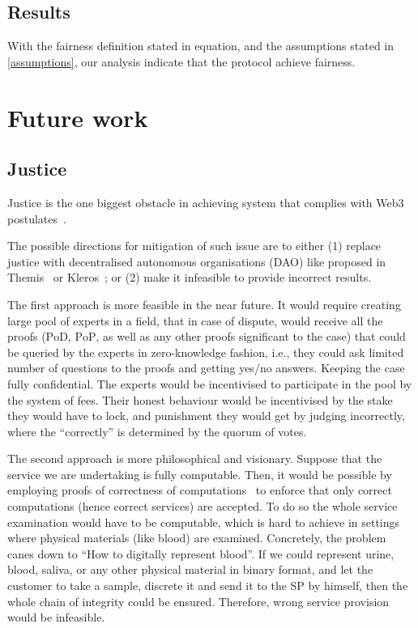 \documentclass{ieeeaccess}
\begin{document}
\subsection{Results}\label{results}

With the fairness definition stated in equation, and the assumptions stated in \ref{assumptions}, our analysis indicate that the protocol achieve fairness.



\section{Future work}\label{sec:future-work}
\subsection{Justice}\label{justice}

Justice is the one biggest obstacle in achieving system that complies with Web3 postulates~\cite{Web3Wiki71}.

The possible directions for mitigation of such issue are to either (1) replace justice with decentralised autonomous organisations (DAO) like proposed in Themis~\cite{meng2019themis} or Kleros~\cite{lesaege2018kleros}; or (2) make it infeasible to provide incorrect results.

The first approach is more feasible in the near future. It would require creating large pool of experts in a field, that in case of dispute, would receive all the proofs ($\mathrm{PoD}$, $\mathrm{PoP}$, as well as any other proofs significant to the case) that could be queried by the experts in zero-knowledge fashion, i.e., they could ask limited number of questions to the proofs and getting yes/no answers. Keeping the case fully confidential. The experts would be incentivised to participate in the pool by the system of fees. Their honest behaviour would be incentivised by the stake they would have to lock, and punishment they would get by judging incorrectly, where the ``correctly'' is determined by the quorum of votes.

The second approach is more philosophical and visionary. Suppose that the service we are undertaking is fully computable. Then, it would be possible by employing proofs of correctness of computations~\cite{ben2013snarks} to enforce that only correct computations (hence correct services) are accepted. To do so the whole service examination would have to be computable, which is hard to achieve in settings where physical materials (like blood) are examined. Concretely, the problem canes down to ``How to digitally represent blood''. If we could represent urine, blood, saliva, or any other physical material in binary format, and let the customer to take a sample, discrete it and send it to the SP by himself, then the whole chain of integrity could be ensured. Therefore, wrong service provision would be infeasible.
\end{document}
